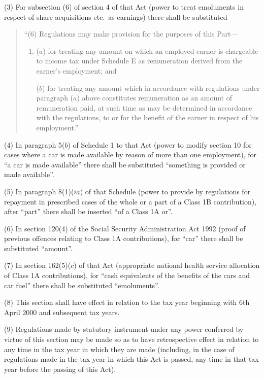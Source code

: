 \documentclass[12pt,a4paper]{article}
\begin{document}
(3) For subsection (6)  of section 4 of that Act (power to treat emoluments in respect of share acquisitions etc.\ as earnings) there shall be substituted—
\begin{quotation}
“(6) Regulations may make provision for the purposes of this Part—
\begin{enumerate}\item[]
($a$) for treating any amount on which an employed earner is chargeable to income tax under Schedule E as remuneration derived from the earner’s employment; and

($b$) for treating any amount which in accordance with regulations under paragraph ($a$)  above constitutes remuneration as an amount of remuneration paid, at such time as may be determined in accordance with the regulations, to or for the benefit of the earner in respect of his employment.”
\end{enumerate}
\end{quotation}

(4) In paragraph 5($b$)  of Schedule 1 to that Act (power to modify section 10 for cases where a car is made available by reason of more than one employment), for “a car is made available” there shall be substituted “something is provided or made available”.

(5) In paragraph 8(1)($ia$) of that Schedule (power to provide by regulations for repayment in prescribed cases of the whole or a part of a Class 1B contribution), after “part” there shall be inserted “of a Class 1A or”.

(6) In section 120(4)  of the Social Security Administration Act 1992 (proof of previous offences relating to Class 1A contributions), for “car” there shall be substituted “amount”.

(7) In section 162(5)($c$)  of that Act (appropriate national health service allocation of Class 1A contributions), for “cash equivalents of the benefits of the cars and car fuel” there shall be substituted “emoluments”.

(8) This section shall have effect in relation to the tax year beginning with 6th April 2000 and subsequent tax years.

(9) Regulations made by statutory instrument under any power conferred by virtue of this section may be made so as to have retrospective effect in relation to any time in the tax year in which they are made (including, in the case of regulations made in the tax year in which this Act is passed, any time in that tax year before the passing of this Act).
\end{document}
